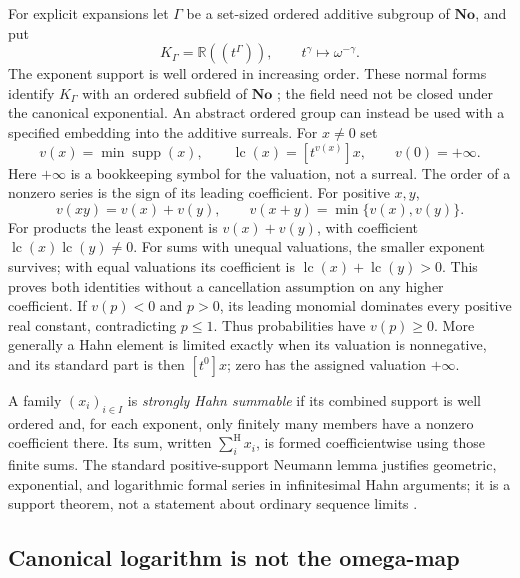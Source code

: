 \documentclass[11pt,a4paper]{article}
\numberwithin{equation}{section}
\theoremstyle{definition}
\theoremstyle{remark}
\newcommand{\R}{\mathbb R}
\newcommand{\No}{\mathbf{No}}
\newcommand{\lc}{\operatorname{lc}}
\newcommand{\supp}{\operatorname{supp}}
\newcommand{\hsum}{\mathop{\sum}\nolimits^{\mathrm H}}
\begin{document}
For explicit expansions let $\Gamma$ be a set-sized ordered additive subgroup
of $\No$, and put
\begin{equation}
 K_\Gamma=\R((t^\Gamma)),\qquad t^\gamma\longmapsto\omega^{-\gamma}.
\end{equation}
The exponent support is well ordered in increasing order. These normal
forms identify $K_\Gamma$ with an ordered subfield of $\No$
\cite[Section~2, p.~176]{vdde}; the field need
not be closed under the canonical exponential. An abstract ordered group
can instead be used with a specified embedding into the additive surreals.
For $x\ne0$ set
\begin{equation}
 v(x)=\min\supp(x),\qquad \lc(x)=[t^{v(x)}]x,
 \qquad v(0)=+\infty.
\end{equation}
Here $+\infty$ is a bookkeeping symbol for the valuation, not a surreal.
The order of a nonzero series is the sign of its leading coefficient.
For positive $x,y$,
\begin{equation}\label{fsp:eq:positiveval}
 v(xy)=v(x)+v(y),\qquad
 v(x+y)=\min\{v(x),v(y)\}.
\end{equation}
For products the least exponent is $v(x)+v(y)$, with coefficient
$\lc(x)\lc(y)\ne0$. For sums with unequal valuations, the smaller
exponent survives; with equal valuations its coefficient is
$\lc(x)+\lc(y)>0$. This proves both identities without a cancellation
assumption on any higher coefficient. If $v(p)<0$ and $p>0$, its leading
monomial dominates every positive real constant, contradicting $p\le1$.
Thus probabilities have $v(p)\ge0$. More generally a Hahn element is limited
exactly when its valuation is nonnegative, and its standard part is then
$[t^0]x$; zero has the assigned valuation $+\infty$.

A family $(x_i)_{i\in I}$ is \emph{strongly Hahn summable} if its combined
support is well ordered and, for each exponent, only finitely many members
have a nonzero coefficient there. Its sum, written $\hsum_i x_i$, is formed
coefficientwise using those finite sums. The standard positive-support
Neumann lemma justifies geometric, exponential, and logarithmic formal
series in infinitesimal Hahn arguments; it is a support theorem, not a
statement about ordinary sequence limits \cite{gonshor,repofound}.

\subsection{Canonical logarithm is not the omega-map}
\end{document}
